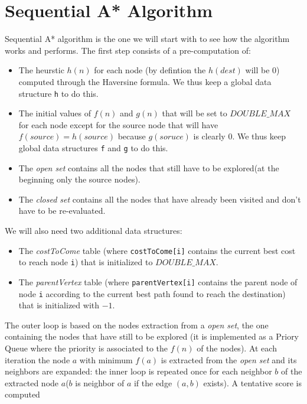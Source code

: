 \documentclass[twocolumn, switch]{article} %
\begin{document}
\section{Sequential A* Algorithm}
Sequential A* algorithm is the one we will start with to see how the algorithm works and performs.
The first step consists of a pre-computation of:
\begin{itemize}
  \item The heurstic $h(n)$ for each node (by defintion the $h(dest)$ will
        be 0) computed through the Haversine formula. We thus keep a global data
        structure \texttt{h} to do this.
  \item The initial values of $f(n)$ and $g(n)$ that will be set to $DOUBLE\_MAX$ for each
        node except for the source node that will have $f(source) = h(source)$ because 
        $g(soruce)$ is clearly $0$. We thus keep global data structures \texttt{f} and \texttt{g} to do this.
  \item The \textit{open set} contains all the nodes that still have to be explored(at
        the beginning only the source nodes).
  \item The \textit{closed set} contains all the nodes that have already been visited and don't
        have to be re-evaluated.
\end{itemize}
We will also need two additional data structures:
\begin{itemize}
  \item The \textit{costToCome} table (where \texttt{costToCome[i]} contains the current
        best cost to reach node \texttt{i}) that is initialized
        to $DOUBLE\_MAX$.
  \item The \textit{parentVertex} table (where \texttt{parentVertex[i]} contains the
        parent node of node \texttt{i} according to the current best path found to reach
        the destination) that is initialized with $-1$.
\end{itemize}
The outer loop is based on the nodes extraction from a \textit{open set}, the one containing
the nodes that have still to be explored (it is implemented as a Priory Queue where the priority
is associated to the $f(n)$ of the nodes). At each iteration the node $a$ with minimum $f(a)$ is
extracted from the \textit{open set} and its neighbors are expanded: the inner loop is repeated once for each neighbor $b$ of the
extracted node $a$($b$ is neighbor of $a$ if the edge $(a, b)$ exists). A tentative score is computed
\end{document}
